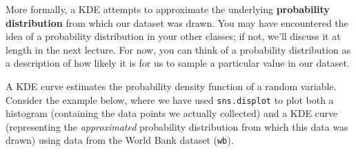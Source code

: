 \documentclass[
  letterpaper,
  DIV=11,
  numbers=noendperiod]{scrreprt}
\newenvironment{Shaded}{\begin{snugshade}}{\end{snugshade}}
\newcommand{\CommentTok}[1]{\textcolor[rgb]{0.37,0.37,0.37}{#1}}
\newcommand{\DecValTok}[1]{\textcolor[rgb]{0.68,0.00,0.00}{#1}}
\newcommand{\ImportTok}[1]{\textcolor[rgb]{0.00,0.46,0.62}{#1}}
\newcommand{\NormalTok}[1]{\textcolor[rgb]{0.00,0.23,0.31}{#1}}
\newcommand{\OperatorTok}[1]{\textcolor[rgb]{0.37,0.37,0.37}{#1}}
\newcommand{\SpecialCharTok}[1]{\textcolor[rgb]{0.37,0.37,0.37}{#1}}
\newcommand{\StringTok}[1]{\textcolor[rgb]{0.13,0.47,0.30}{#1}}
\begin{document}
More formally, a KDE attempts to approximate the underlying
\textbf{probability distribution} from which our dataset was drawn. You
may have encountered the idea of a probability distribution in your
other classes; if not, we'll discuss it at length in the next lecture.
For now, you can think of a probability distribution as a description of
how likely it is for us to sample a particular value in our dataset.

A KDE curve estimates the probability density function of a random
variable. Consider the example below, where we have used
\texttt{sns.displot} to plot both a histogram (containing the data
points we actually collected) and a KDE curve (representing the
\emph{approximated} probability distribution from which this data was
drawn) using data from the World Bank dataset (\texttt{wb}).

\begin{Shaded}
\end{Shaded}
\end{document}
